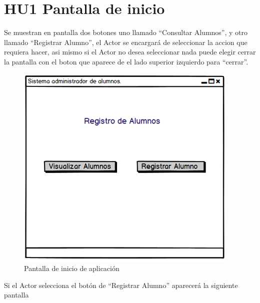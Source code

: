 


\section{HU1 Pantalla de inicio}

Se muestran en pantalla dos botones uno llamado “Consultar Alumnos”, y otro llamado “Registrar Alumno”, el Actor se encargará de seleccionar la accion que requiera hacer, asi mismo si el Actor no desea seleccionar nada puede elegir cerrar la pantalla con el boton que aparece de el lado superior izquierdo para “cerrar”.
\begin{figure}[h]
	\centering
	\includegraphics[scale=0.5]{./HistoriasUsuario/imagenes/IHU1.png}
	\caption{Pantalla de inicio de aplicación}
\end{figure}
Si el Actor selecciona el botón de “Registrar Alumno” aparecerá la siguiente pantalla 
